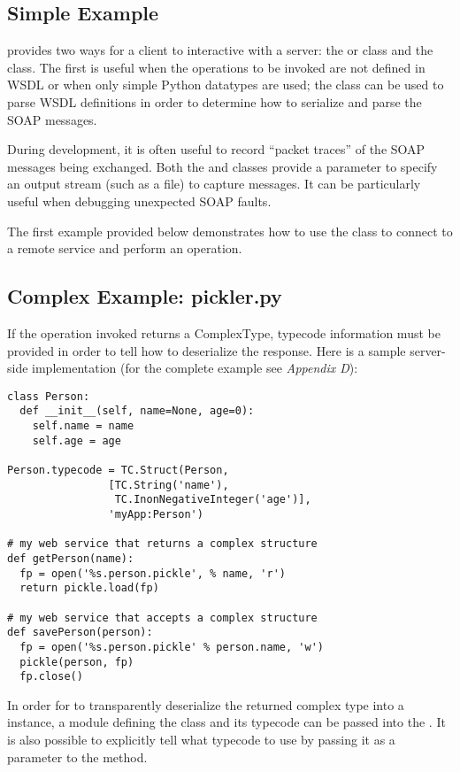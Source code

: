 \subsection{Simple Example}
\ZSI{} provides two ways for a client to interactive with a server:
the  or  class and the
 class.  The first is useful when the operations to be
invoked are not defined in WSDL or when only simple Python datatypes are used;
the  class can be used to parse WSDL definitions in order
to determine how to serialize and parse the SOAP messages.

During development, it is often useful to record ``packet traces'' of
the SOAP messages being exchanged.  Both the  and
 classes provide a  parameter to specify an
output stream (such as a file) to capture messages.  It can be particularly
useful when debugging unexpected SOAP faults.

The first example provided below demonstrates how to use the 
class to connect to a remote service and perform an operation.



\subsection{Complex Example: pickler.py}
If the operation invoked returns a ComplexType, typecode information must
be provided in order to tell \ZSI{} how to deserialize the response.
Here is a sample server-side implementation (for the complete example see
\emph{Appendix D}):

\begin{verbatim}
class Person:
  def __init__(self, name=None, age=0):
    self.name = name
    self.age = age

Person.typecode = TC.Struct(Person,
			    [TC.String('name'),
			     TC.InonNegativeInteger('age')],
			    'myApp:Person')

# my web service that returns a complex structure
def getPerson(name):
  fp = open('%s.person.pickle', % name, 'r')
  return pickle.load(fp)

# my web service that accepts a complex structure
def savePerson(person):
  fp = open('%s.person.pickle' % person.name, 'w')
  pickle(person, fp)
  fp.close()
\end{verbatim}

In order for \ZSI{} to transparently deserialize the returned complex type into
a  instance, a module defining the class and its typecode can be
passed into the . It is also possible to explicitly tell \ZSI{}
what typecode to use by passing it as a parameter to the 
method.

